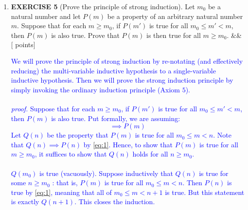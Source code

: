 \documentclass[12pt]{article}
\newcommand{\points}[1]{\hfill {[#1 points]}}
\newcommand{\problem}[2][]{%
  \item {#2}%
  \ifx&#1&%
  \else%
    \points{#1}%
  \fi
  \par\vspace{0.5em}
}
\begin{document}
\begin{enumerate}[leftmargin=*, label=\textbf{\arabic*.}]
\begin{enumerate}
	\problem{If $a > b$, then $a\text{++} > b$}	
	\textcolor{blue}{
	\begin{align*}
	a > b \implies& a\text{++} > a > b \;\; \text{(definition of successor)}\\
	\implies& a\text{++} > b \;\; \text{(transitivity)}\\
	\end{align*}}
	
	\problem{If $a = b$, then $a\text{++} > b$}	
	\textcolor{blue}{
	\begin{align*}
	a = b \implies& a\text{++} > a = b \;\; \text{(definition of successor)}\\
	\implies& a\text{++} > b\\
	\end{align*}}
	\end{enumerate}
	
	\problem{\textbf{EXERCISE 5} (Prove the principle of strong induction). Let $m_0$ be a natural number and let $P(m)$ be a property of an arbitrary natural number $m$. Suppose that for each $m \geq m_0$, if $P(m')$ is true for all $m_0 \leq m' < m$, then $P(m)$ is also true. Prove that $P(m)$ is then true for all $m \geq m_0$.}
	\textcolor{blue}{
	We will prove the principle of strong induction by re-notating (and effectively reducing) the multi-variable inductive hypothesis to a single-variable inductive hypothesis. Then we will prove the strong induction principle by simply invoking the ordinary induction principle (Axiom $5$). \\ \\
	\textit{proof.} Suppose that for each $m \geq m_0$, if $P(m')$ is true for all $m_0 \leq m' < m$, then $P(m)$ is also true. Put formally, we are assuming: 
	\begin{equation}
	[\forall m \geq m_0(\forall m' (m_0 \leq m' < m) \implies P(m'))] \implies P(m)
	\label{eq:1}
	\end{equation}
	Let $Q(n)$ be the property that $P(m)$ is true for all $m_0 \leq m < n$. Note that $Q(n) \implies P(n)$ by \eqref{eq:1}. Hence, to show that $P(m)$ is true for all $m \geq m_0$, it suffices to show that $Q(n)$ holds for all $n \geq m_0$. \\ \\$Q(m_0)$ is true (vacuously). Suppose inductively that $Q(n)$ is true for some $n \geq m_0$ : that is, $P(m)$ is true for all $m_0 \leq m < n$. Then $P(n)$ is true by \eqref{eq:1}, meaning that all of $m_0 \leq m < n+1$ is true. But this statement is exactly $Q(n+1)$. This closes the induction.}
	

\end{enumerate}
\end{document}
